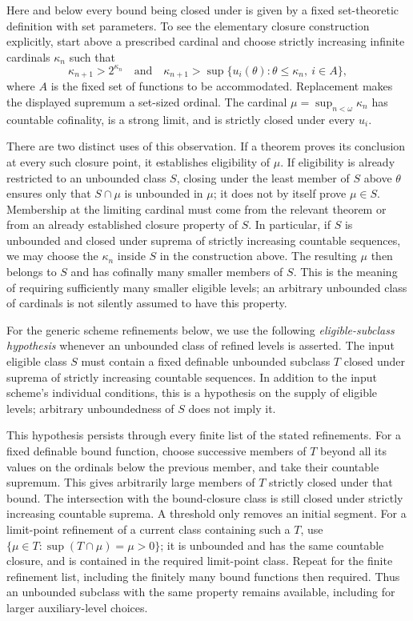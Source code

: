 Here and below every bound being closed under is given by a fixed
set-theoretic definition with set parameters.  To see the elementary
closure construction explicitly, start above a prescribed cardinal and
choose strictly increasing infinite cardinals $\kappa_n$ such that
\[
 \kappa_{n+1}>2^{\kappa_n}
 \quad\text{and}\quad
 \kappa_{n+1}>
 \sup\{u_i(\theta):\theta\leq\kappa_n,\ i\in A\},
\]
where $A$ is the fixed set of functions to be accommodated.  Replacement
makes the displayed supremum a set-sized ordinal.  The cardinal
$\mu=\sup_{n<\omega}\kappa_n$ has countable cofinality, is a strong limit,
and is strictly closed under every $u_i$.

There are two distinct uses of this observation.  If a theorem proves
its conclusion at every such closure point, it establishes eligibility
of $\mu$.  If eligibility is already restricted to an unbounded class
$S$, closing under the least member of $S$ above $\theta$ ensures only
that $S\cap\mu$ is unbounded in $\mu$; it does not by itself prove
$\mu\in S$.  Membership at the limiting cardinal must come from the
relevant theorem or from an already established closure property of
$S$.  In particular, if $S$ is unbounded and closed under suprema of
strictly increasing countable sequences, we may choose the $\kappa_n$
inside $S$ in the construction above.  The resulting $\mu$ then belongs
to $S$ and has cofinally many smaller members of $S$.  This is the
meaning of requiring sufficiently many smaller eligible levels; an
arbitrary unbounded class of cardinals is not silently assumed to have
this property.

\begin{convention}
\label{lev:eligible-subclass}
For the generic scheme refinements below, we use the following
\emph{eligible-subclass hypothesis} whenever an unbounded class of
refined levels is asserted.  The input eligible class $S$ must contain
a fixed definable unbounded subclass $T$ closed under suprema of
strictly increasing countable sequences.  In addition to the input
scheme's individual conditions, this is a hypothesis on the supply
of eligible levels; arbitrary unboundedness of $S$ does not imply it.
\end{convention}

This hypothesis persists through every finite list of the stated
refinements.  For a fixed definable bound function, choose successive
members of $T$ beyond all its values on the ordinals below the previous
member, and take their countable supremum.  This gives arbitrarily
large members of $T$ strictly closed under that bound.  The intersection
with the bound-closure class is still closed under strictly increasing
countable suprema.  A threshold only removes an initial segment.
For a limit-point refinement of a current class containing such a $T$,
use $\{\mu\in T:\sup(T\cap\mu)=\mu>0\}$; it is unbounded and has the same countable closure,
and is contained in the required limit-point class.  Repeat for the
finite refinement list, including the finitely many bound functions
then required.  Thus an unbounded subclass with the same property
remains available, including for larger auxiliary-level choices.

